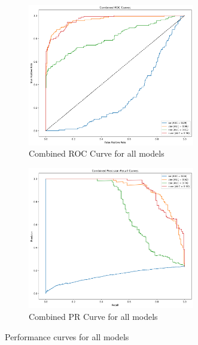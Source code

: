 \begin{figure}[!htbp]
    \centering
    \begin{subfigure}[b]{\textwidth}
        \centering
        \includegraphics[width=0.8\textwidth]{figures/anomalies/combined_roc_curve.png}
        \caption{Combined ROC Curve for all models}
        \label{fig:roccurve}
    \end{subfigure}
    \vspace{1em}
    \begin{subfigure}[b]{\textwidth}
        \centering
        \includegraphics[width=0.8\textwidth]{figures/anomalies/combined_pr_curve.png}
        \caption{Combined PR Curve for all models}
        \label{fig:prcurve}
    \end{subfigure}
    \caption{Performance curves for all models}
    \label{fig:combined_curves}
\end{figure}
\clearpage

